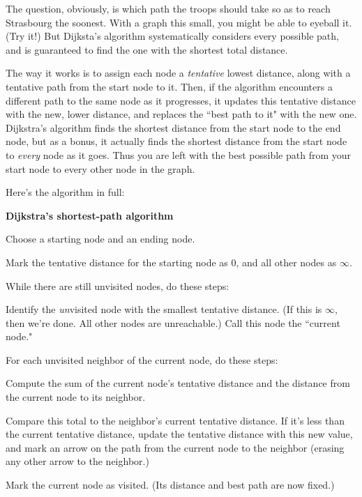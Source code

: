 The question, obviously, is which path the troops should take so as to
reach Strasbourg the soonest. With a graph this small, you might be able to
eyeball it. (Try it!) But Dijksta's algorithm systematically considers
every possible path, and is guaranteed to find the one with the shortest
total distance.

The way it works is to assign each node a \textit{tentative} lowest
distance, along with a tentative path from the start node to it. Then, if
the algorithm encounters a different path to the same node as it
progresses, it updates this tentative distance with the new, lower
distance, and replaces the ``best path to it" with the new one. Dijkstra's
algorithm finds the shortest distance from the start node to the end node,
but as a bonus, it actually finds the shortest distance from the start node
to \textit{every} node as it goes. Thus you are left with the best possible
path from your start node to every other node in the graph.

Here's the algorithm in full:

\vspace{.1in}
\begin{samepage}
\begin{framed}
\textbf{Dijkstra's shortest-path algorithm}
\begin{compactenum}
\item Choose a starting node and an ending node.
\item Mark the tentative distance for the starting node as 0, and all
other nodes as $\infty$.
\item While there are still unvisited nodes, do these steps:
    \begin{compactenum}
    \item \label{choose} Identify the \textit{un}visited node with the smallest tentative
distance. (If this is $\infty$, then we're done. All other nodes are
unreachable.) Call this node the ``current node."
    \item For each unvisited neighbor of the current node, do these steps:
        \begin{compactenum}
        \item Compute the sum of the current node's tentative distance and
the distance from the current node to its neighbor.
        \item Compare this total to the neighbor's current tentative
distance. If it's less than the current tentative distance, update the
tentative distance with this new value, and mark an arrow on the path from
the current node to the neighbor (erasing any other arrow to the neighbor.)
        \item Mark the current node as visited. (Its distance and best path
are now fixed.)
        \end{compactenum}
    \end{compactenum}
\end{compactenum}
\end{framed}
\end{samepage}
\vspace{.2in}

